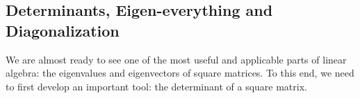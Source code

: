 % 
%
%

\begin{partbacktext}
\part{Determinants, Eigen-everything  and Diagonalization}
\noindent We are almost ready to  see one of the most useful and applicable parts of linear algebra: the eigenvalues and eigenvectors of square matrices.  To this end, we need to first develop an important tool: the determinant of a square matrix.
\end{partbacktext}
